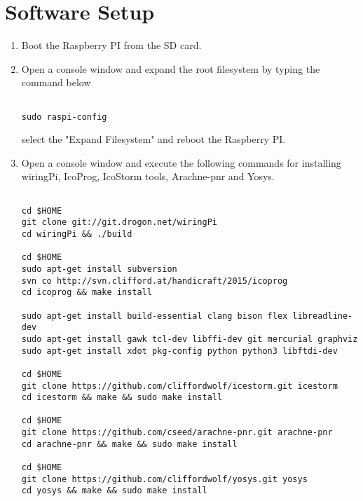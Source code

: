 \documentclass[journal,12pt,twocolumn]{IEEEtran}
\begin{document}
\section{Software Setup}
\begin{enumerate}
\item Boot the Raspberry PI from the SD card.
\item Open a console window and expand the root filesystem by typing the command below 

\begin{verbatim}

sudo raspi-config

\end{verbatim}
select the "Expand Filesystem" and reboot the Raspberry PI.

\item Open a console window and execute the following commands for installing wiringPi, IcoProg, IcoStorm tools, Arachne-pnr and Yosys.
\begin{lstlisting}

cd $HOME
git clone git://git.drogon.net/wiringPi
cd wiringPi && ./build

cd $HOME
sudo apt-get install subversion
svn co http://svn.clifford.at/handicraft/2015/icoprog
cd icoprog && make install

sudo apt-get install build-essential clang bison flex libreadline-dev 
sudo apt-get install gawk tcl-dev libffi-dev git mercurial graphviz   
sudo apt-get install xdot pkg-config python python3 libftdi-dev

cd $HOME
git clone https://github.com/cliffordwolf/icestorm.git icestorm
cd icestorm && make && sudo make install

cd $HOME
git clone https://github.com/cseed/arachne-pnr.git arachne-pnr
cd arachne-pnr && make && sudo make install

cd $HOME
git clone https://github.com/cliffordwolf/yosys.git yosys
cd yosys && make && sudo make install

\end{lstlisting}







\end{enumerate}
\end{document}
